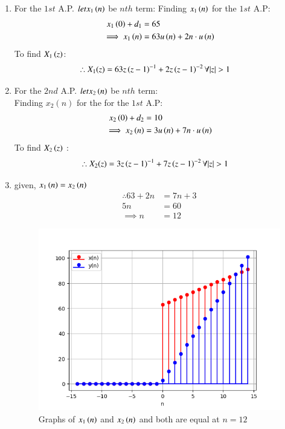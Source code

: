 \documentclass[journal,12pt,twocolumn]{IEEEtran}
\theoremstyle{remark}
\begin{document}
\begin{enumerate}
\item
For the $ 1{st}$ A.P. $ let x_1\left(n\right)$  be $ nth$ term: 
Finding $ x_1\left(n\right)$ for the $ 1{st}$ A.P:
\begin{align}
x_1\left(0\right)+d_1 &= 65\\
\implies x_1\left(n\right) &= 63u\left(n\right) + 2n\cdot u\left(n\right) \label{eq:3}
\end{align}
To find $ X_1\left(z\right)$:
\begin{align}
\therefore X_1(z) &= 63z\brak{z-1}^{-1} + 2z\brak{z-1}^{-2}  \forall  |z|>1
\end{align}
\item
For the $ 2{nd}$ A.P.  $ let x_2\left(n\right)$  be $ nth$ term:\\
Finding $ x_2(n)$ for the for the $ 1{st}$ A.P:
\begin{align}
x_2\left(0\right)+d_2 &= 10\\
\implies x_2\left(n\right) &= 3u\left(n\right) + 7n\cdot u\left(n\right) \label{eq:4} 
\end{align}
To find $ X_2\left(z\right)$ :\\
\begin{align}
\therefore X_2(z) &= 3z\brak{z-1}^{-1} + 7z\brak{z-1}^{-2}  \forall  |z|>1
\end{align}
\item

given, $ x_1\left(n\right) = x_2\left(n\right)$\\
\begin{align}
\therefore 63 + 2n &= 7n+3\\
5n &= 60\\
\implies n &= 12
\end{align}\begin{figure}[ht]
    \includegraphics[width = \linewidth]{Figure_1.png}
    \caption{Graphs of $ x_1\left(n\right)$ and $ x_2\left(n\right)$ and both are equal at $ n=12$}
    \label{Fig:1}
\end{figure}
\end{enumerate}
\end{document}
